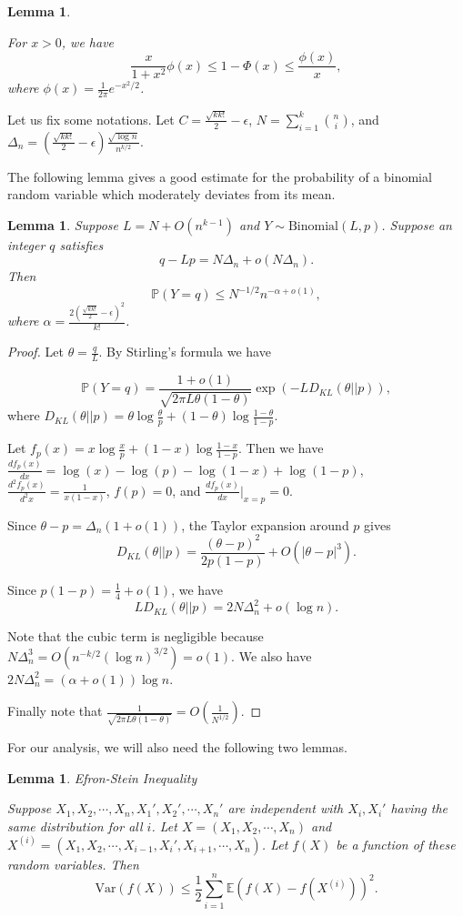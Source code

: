 \documentclass[reqno,11pt]{amsart}
\newtheorem{lemma}[theorem]{Lemma}
\renewcommand{\le}{\leqslant}
\renewcommand{\leq}{\leqslant}
\begin{document}
\begin{lemma} \cite{Gordon1941} \label{lemma:Gordon}

For $x >0$, we have 
$$\frac{x}{1+x^2}\phi(x) \leq 1- \Phi(x) \leq \frac{\phi(x)}{x},$$
where $\phi(x)=\frac{1}{2\pi}e^{-x^2/2}$. 
    
\end{lemma}

Let us fix some notations. 
Let $C=\frac{\sqrt{kk!}}{2}-\epsilon$, $N=\sum_{i=1}^k \binom{n}{i}$, and $\Delta_n=\left(\frac{\sqrt{kk!}}{2}-\epsilon \right)\frac{\sqrt{\log n}}{n^{k/2}}$. 

The following lemma gives a good estimate for the probability of a binomial random variable which moderately deviates from its mean. 
\begin{lemma} \label{lemma: binom approx}
Suppose $L=N+O(n^{k-1})$ and $Y\sim \text{Binomial}(L,p)$. Suppose an integer $q$ satisfies
$$q-Lp=N\Delta_n+o(N\Delta_n).$$
Then $$
\mathbb P(Y=q) \le N^{-1/2}n^{-\alpha+o(1)},
$$
where $\alpha=\frac{2(\frac{\sqrt{kk!}}{2}-\epsilon)^2}{k!}$.

\end{lemma}
\begin{proof}
Let $\theta= \frac{q}{L}$. By Stirling’s formula we have

$$\mathbb{P}(Y=q)= \frac{1+o(1)}{\sqrt{2 \pi L \theta (1-\theta)}} \exp(-LD_{KL}(\theta || p)),$$
where $D_{KL}(\theta || p)=\theta \log \frac{\theta}{p}+(1-\theta) \log \frac{1-\theta}{1-p}$.

Let $f_p(x)=x\log \frac{x}{p}+(1-x)\log \frac{1-x}{1-p}$. Then we have 
$\frac{df_p(x)}{dx}= \log(x)-\log(p)-\log(1-x)+\log(1-p)$, $\frac{d^2f_p(x)}{d^2x}= \frac{1}{x(1-x)}$, $f(p)=0$, and $\frac{df_p(x)}{dx}|_{x=p}=0$.




Since $\theta -p=\Delta_n(1+o(1))$, the Taylor expansion around $p$ gives
$$D_{KL}(\theta || p)=\frac{(\theta -p)^2}{2p(1-p)}+O(|\theta -p|^3).$$

Since $p(1-p)=\frac{1}{4}+o(1)$,  we have$$L D_{KL}(\theta ||p)=2N\Delta_n^2+o(\log n).$$


Note that the cubic term is negligible because $N\Delta_n^3=O(n^{-k/2} (\log n)^{3/2})=o(1)$. We also have 
$2N\Delta_n^2=(\alpha+o(1)) \log n$. 

Finally note that $\frac{1}{\sqrt{2 \pi L \theta (1-\theta)}}=O(\frac{1}{N^{1/2}})$. \qedhere
\end{proof}

For our analysis, we will also need the following two lemmas. 
\begin{lemma} Efron-Stein Inequality \label{lemma: efron}

Suppose $X_1,X_2,\cdots,X_n, X_1',X_2', \cdots, X_n'$ are independent with $X_i, X_i'$ having the same distribution for all $i$. Let $X=(X_1,X_2,\cdots,X_n)$ and $X^{(i)}=(X_1,X_2,\cdots, X_{i-1},X_i',X_{i+1},\cdots,X_{n})$. Let $f(X)$ be a function of these random variables. Then 
$$\text{Var}(f(X)) \leq \frac{1}{2}\sum_{i=1}^n \mathbb{E}(f(X)-f(X^{(i)}))^2.$$
\end{lemma}
\end{document}
